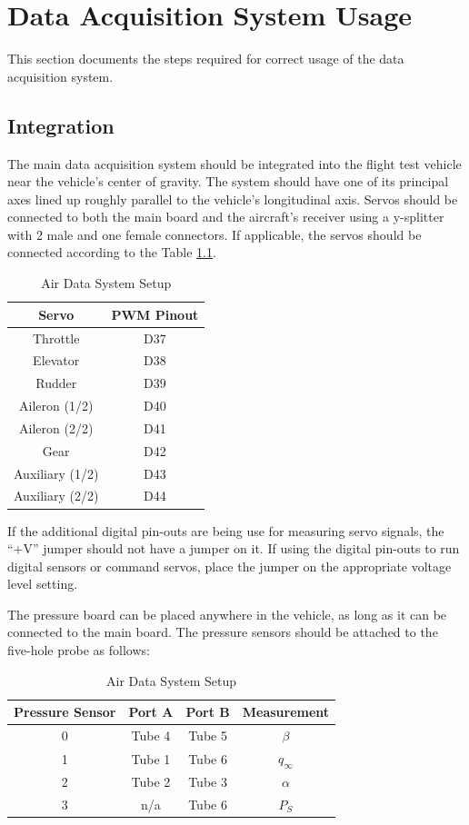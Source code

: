 \chapter{Data Acquisition System Usage}
This section documents the steps required for correct usage of the data acquisition system.

\section{Integration}
The main data acquisition system should be integrated into the flight test vehicle near the vehicle's center of gravity. The system should have one of its principal axes lined up roughly parallel to the vehicle's longitudinal axis. Servos should be connected to both the main board and the aircraft's receiver using a y-splitter with 2 male and one female connectors. If applicable, the servos should be connected according to the Table \ref{table:servoSetup}.
\begin{table}[ht]
\caption{Air Data System Setup}
\centering
\begin{tabular}{c c}
\hline\hline
 Servo & PWM Pinout\\
\hline
Throttle & D37\\
Elevator & D38\\
Rudder & D39\\ 
Aileron (1/2) & D40\\
Aileron (2/2) & D41\\
Gear & D42\\
Auxiliary (1/2)& D43\\
Auxiliary (2/2)& D44\\
\hline
\end{tabular}
\label{table:servoSetup}
\end{table}

If the additional digital pin-outs are being use for measuring servo signals, the ``+V'' jumper should not have a jumper on it. If using the digital pin-outs to run digital sensors or command servos, place the jumper on the appropriate voltage level setting.

The pressure board can be placed anywhere in the vehicle, as long as it can be connected to the main board. The pressure sensors should be attached to the five-hole probe as follows:

\begin{table}[ht]
\caption{Air Data System Setup}
\centering
\begin{tabular}{c c c c}
\hline\hline
 Pressure Sensor & Port A & Port B & Measurement\\
\hline
0 & Tube 4 & Tube 5 & $\beta$ \\
1 & Tube 1 & Tube 6 & $q_{\infty}$\\
2 & Tube 2 & Tube 3 & $\alpha$\\ 
3 & n/a & Tube 6 & $P_S$\\
\hline
\end{tabular}
\label{table:airDataSetup}
\end{table}

